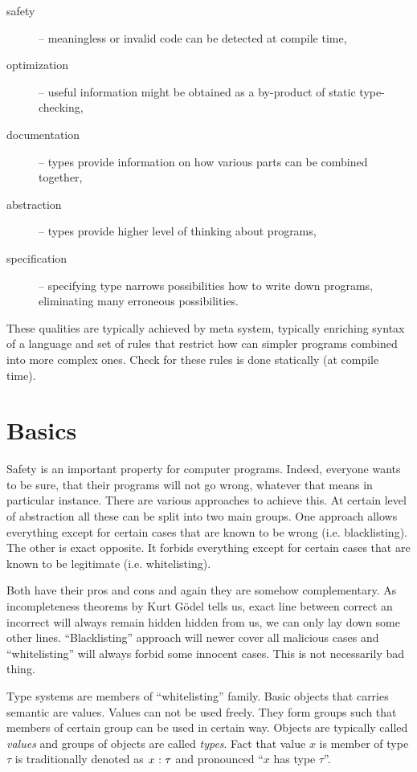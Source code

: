 \documentclass[11pt,oneside,draft]{fithesis2}
\newcommand\uv[1]{``#1''}
\theoremstyle{definition}
\begin{document}
\begin{description}
	\item[safety] -- meaningless or invalid code can be detected at compile time,
	\item[optimization] -- useful information might be obtained as a by-product of static type-checking,
	\item[documentation] -- types provide information on how various parts can be combined together,
	\item[abstraction] -- types provide higher level of thinking about programs,
	\item[specification] -- specifying type narrows possibilities how to write down programs,
		eliminating many erroneous possibilities.
\end{description}

These qualities are typically achieved by meta system, typically
enriching syntax of a language and set of rules that restrict how can
simpler programs combined into more complex ones.
Check for these rules is done statically (at compile time).

\section{Basics}

Safety is an important property for computer programs.
Indeed, everyone wants to be sure, that their programs will not go wrong,
whatever that means in particular instance. There are various
approaches to achieve this. At certain level of abstraction
all these can be split into two main groups. One approach
allows everything except for certain cases that are known to be wrong
(i.e. blacklisting). The other is exact opposite. It forbids
everything except for certain cases that are known to be legitimate
(i.e. whitelisting).

Both have their pros and cons and again they are somehow complementary.
As incompleteness theorems by Kurt G\"{o}del tells us, exact line
between correct an incorrect will always remain hidden hidden from us,
we can only lay down some other lines. \uv{Blacklisting} approach
will newer cover all malicious cases and \uv{whitelisting} will
always forbid some innocent cases. This is not necessarily bad thing.

Type systems are members of \uv{whitelisting} family.  Basic objects that
carries semantic are values. Values can not be used freely. They form
groups such that members of certain group can be used in certain way.
Objects are typically called \emph{values} and groups of objects are
called \emph{types}. Fact that value \(x\) is member of type \(\tau\)
is traditionally denoted as \(x ~{:}~ \tau\) and pronounced \uv{\(x\)
has type \(\tau\)}.
\end{document}
